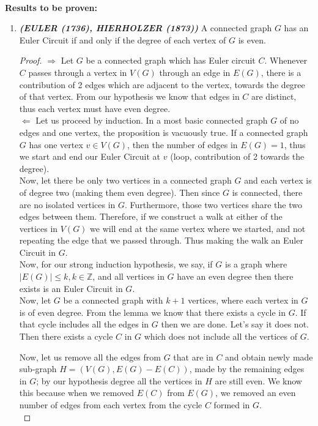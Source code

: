 \documentclass[12pt, fullpage]{article}
\newcommand{\Z}{\mathbb Z}
\begin{document}
\textbf{\\Results to be proven: }

\begin{enumerate}
	\item \textit{\textbf{(EULER (1736), HIERHOLZER (1873))}} A connected graph $G$ has an Euler Circuit if and only if the degree of each vertex of $G$ is even.
\begin{proof}
 	$\Longrightarrow$ Let $G$ be a connected graph which has Euler circuit $C$. Whenever $C$ passes through a vertex in $V(G)$ through an edge in $E(G)$, there is a contribution of 2 edges which are adjacent to the vertex, towards the degree of that vertex. From our hypothesis we know that edges in $C$ are distinct, thus each vertex must have even degree. \\
 	
 	$\Longleftarrow$ Let us proceed by induction. In a most basic connected graph $G$ of no edges and one vertex, the proposition is vacuously true. If a connected graph $G$ has one vertex $v \in V(G)$, then the number of edges in $E(G) = 1$, thus we start and end our Euler Circuit at $v$ (loop, contribution of 2 towards the degree). \\
 	
 	Now, let there be only two vertices in a connected graph $G$ and each vertex is of degree two (making them even degree). Then since $G$ is connected, there are no isolated vertices in $G$. Furthermore, those two vertices share the two edges between them. Therefore, if we construct a walk at either of the vertices in $V(G)$ we will end at the same vertex where we started, and not repeating the edge that we passed through. Thus making the walk an Euler Circuit in $G$.\\ 
 	
 	Now, for our strong induction hypothesis, we say, if $G$ is a graph where $\vert E(G)\vert \leq k, k \in \Z$, and all vertices in $G$ have an even degree then there exists	 is an Euler Circuit in $G$.\\
 	
 	 Now, let $G$ be a connected graph with $k+1$ vertices, where each vertex in $G$ is of even degree. From the lemma we know that there exists a cycle in $G$. If that cycle includes all the edges in $G$ then we are done. Let's say it does not. Then there exists a cycle $C$ in $G$ which does not include all the vertices of $G$. 
 	 
 	 Now, let us remove all the edges from $G$ that are in $C$ and obtain newly made sub-graph $H = (V(G), E(G)-E(C))$, made by the remaining edges in $G$; by our hypothesis degree all the vertices in $H$ are still even. We know this because when we removed $E(C)$ from $E(G)$, we removed an even number of edges from each vertex from the cycle $C$ formed in $G$.\\
 	 

\end{proof}
\end{enumerate}
\end{document}

